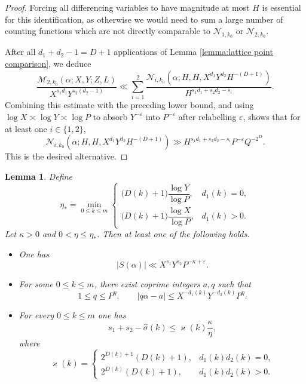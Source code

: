\documentclass[12pt,reqno]{amsart}
\newtheorem{lemma}[theorem]{Lemma}
\theoremstyle{definition}
\theoremstyle{remark}
\numberwithin{equation}{section}
\def\calN{{\mathcal N}}
\def\a{{\alpha}} \def\bfalp{{\boldsymbol \alpha}} \def\atil{{\widetilde \alpha}}
\def\eps{\varepsilon}
\begin{document}
\begin{proof}
    Forcing all differencing variables to have magnitude at most $H$ is essential for this 
    identification, as otherwise we would need to sum a large number of counting functions 
    which are not directly comparable to $\calN_{1,k_0}$ or $\calN_{2,k_0}$.

    After all $d_1+d_2-1=D+1$ applications of Lemma \ref{lemma:lattice point comparison}, we deduce
    \[
        \frac{\mathcal M_{2,k_0}(\a;X,Y;Z,L)}
        {X^{s_1d_1}Y^{s_2(d_2-1)}}
        \ll
        \sum_{i=1}^{2}
        \frac{
            \mathcal N_{i,k_0}
            \left(
                \a;H,H,
                X^{d_1}Y^{d_2}H^{-(D+1)}
            \right)
        }{H^{s_1d_1+s_2d_2-s_i}}.
    \]
    Combining this estimate with the preceding lower bound, and using
    $\log X\asymp\log Y\asymp\log P$ to absorb $Y^{-\eps}$ into
    $P^{-\eps}$ after relabelling $\eps$, shows that for at least one
    $i\in\{1,2\}$,
    \[
        \mathcal N_{i,k_0}
        \left(
            \a;H,H,
            X^{d_1}Y^{d_2}H^{-(D+1)}
        \right)
        \gg
        H^{s_1d_1+s_2d_2-s_i}P^{-\eps}Q^{-2^D}.
    \]
    This is the desired alternative.

\end{proof}

\begin{lemma}\label{lemma:hat sigma weighted Weyl alternative}
    Define
    \[
        \eta_*
        =\min_{0\leq k\leq m}
        \begin{cases}
        \bigl(D(k)+1\bigr)\dfrac{\log Y}{\log P},
            & d_1(k)=0,\\[3mm]
        \bigl(D(k)+1\bigr)\dfrac{\log X}{\log P},
            & d_1(k)>0.
        \end{cases}
    \]
    Let $\kappa>0$ and $0<\eta\leq\eta_*$. Then at least one of the
    following holds.
    \begin{itemize}
        \item One has
        \[
            |S(\a)|\ll X^{s_1}Y^{s_2}P^{-\kappa+\eps}.
        \]
        \item For some $0\leq k\leq m$, there exist coprime
        integers $a,q$ such that
        \[
            1\leq q\leq P^\eta,
            \qquad
            |q\a-a|
            \leq
            X^{-d_1(k)}Y^{-d_2(k)}P^\eta.
        \]
        \item For every $0\leq k\leq m$ one has
        \[
            s_1+s_2-\widehat{\sigma}(k)
            \leq
            \varkappa(k)\frac{\kappa}{\eta},
        \]
        where
        \[
            \varkappa(k)=
            \begin{cases}
                2^{D(k)+1}(D(k)+1),
                    & d_1(k)d_2(k)=0,\\
                2^{D(k)}(D(k)+1),
                    & d_1(k)d_2(k)>0.
            \end{cases}
        \]
    \end{itemize}
\end{lemma}
\end{document}

